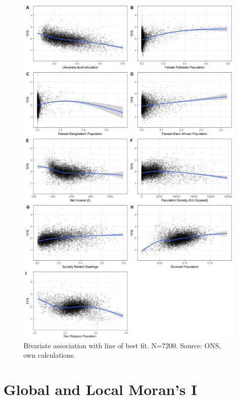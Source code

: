 \documentclass[12pt,twoside]{reedthesis}
\begin{document}
\begin{figure}
\includegraphics[width=0.95\linewidth]{figure/Figure_7} \caption{Bivariate association with line of best fit. N=7200. Source: ONS, own calculations.}\label{fig:figure7}
\end{figure}
\hypertarget{global-and-local-morans-i}{%
\section{Global and Local Moran's I}\label{global-and-local-morans-i}}
\end{document}
